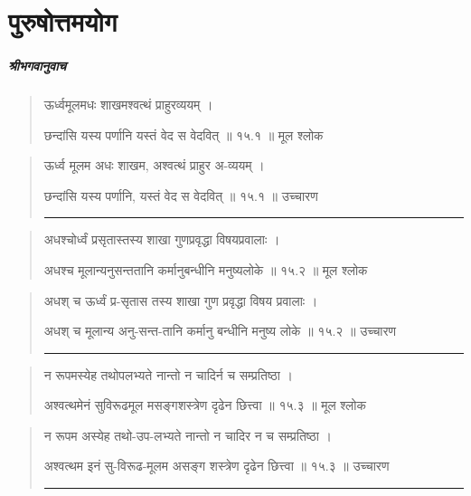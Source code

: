 \chapter{\sanskrit पुरुषोत्तमयोग} 
\paragraph{\sanskrit श्रीभगवानुवाच}
\begin{quotation} 
ऊर्ध्वमूलमधः शाखमश्वत्थं प्राहुरव्ययम्‌  ।  

छन्दांसि यस्य पर्णानि यस्तं वेद स वेदवित्‌  ॥ १५.१ ॥  मूल श्लोक
\end{quotation}

\begin{quotation}

ऊर्ध्व मूलम अधः शाखम, अश्वत्थं प्राहुर अ-व्ययम्‌  ।  

छन्दांसि यस्य पर्णानि, यस्तं वेद स वेदवित्‌  ॥ १५.१ ॥  उच्चारण

\noindent\rule{16cm}{0.4pt} 
\end{quotation}


\begin{quotation}

अधश्चोर्ध्वं प्रसृतास्तस्य शाखा गुणप्रवृद्धा विषयप्रवालाः  ।  

अधश्च मूलान्यनुसन्ततानि कर्मानुबन्धीनि मनुष्यलोके  ॥ १५.२ ॥  मूल श्लोक
\end{quotation}

\begin{quotation}

अधश् च ऊर्ध्वं प्र-सृतास तस्य शाखा 
गुण प्रवृद्धा विषय प्रवालाः  ।  

अधश् च मूलान्य अनु-सन्त-तानि 
कर्मानु बन्धीनि मनुष्य लोके  ॥ १५.२ ॥  उच्चारण

\noindent\rule{16cm}{0.4pt} 
\end{quotation}


\begin{quotation}

न रूपमस्येह तथोपलभ्यते नान्तो न चादिर्न च सम्प्रतिष्ठा  ।  

अश्वत्थमेनं सुविरूढमूल मसङ्‍गशस्त्रेण दृढेन छित्त्वा  ॥ १५.३ ॥  मूल श्लोक
\end{quotation}

\begin{quotation}

न रूपम अस्येह तथो-उप-लभ्यते 
नान्तो न चादिर न च सम्प्रतिष्ठा  ।  

अश्वत्थम इनं सु-विरूढ-मूलम
असङ्‍ग शस्त्रेण दृढेन छित्त्वा  ॥ १५.३ ॥  उच्चारण

\noindent\rule{16cm}{0.4pt} 
\end{quotation}


